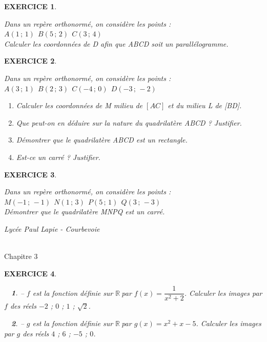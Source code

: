\documentclass[a4paper]{article}   %
\renewcommand{\(}{\left(}
\renewcommand{\)}{\right)}
\newtheorem{ques}{~}
\newenvironment{qu}{\begin{ques}--} {\end{ques}}
\newtheorem{EXO}{\large EXERCICE }
\newenvironment{EX}   { \setcounter{ques}{0} \begin{EXO} \hrulefill ~\vspace{0.3cm}

\normalfont}    {\end{EXO} \medskip}
\newcommand{\R}{ ${\mathbb R} ~$}
\newcommand{\f}{\dfrac} 	%
\def\cl{{\Large \bf{2nde}}}
\begin{document}
\begin{EX} Dans un repère orthonormé, on considère les points : $A(1\,;\,1) ~~ B(5\,;\,2)~~C(3\,;\,4)$ \\
Calculer les coordonnées de D afin que ABCD soit un parallélogramme.

\end{EX}

\begin{EX}  Dans un repère orthonormé, on considère les points : $A(3\,;\,1) ~~ B(2\,;\,3)~~C(-4\,;\,0)~~D(-3\,;\,-2)$
 \begin{enumerate}
\item Calculer les coordonnées de M milieu de $[AC]$ et du milieu L de [BD].
\item Que peut-on en déduire sur la nature du quadrilatère ABCD ? Justifier.
\item Démontrer que le quadrilatère ABCD est un rectangle.
\item Est-ce un carré ? Justifier.
\end{enumerate}
\end{EX}


\begin{EX}  Dans un repère orthonormé, on considère les points : $M(-1\,;\,-1) ~~ N(1\,;\,3)~~P(5\,;\,1)~~Q(3\,;\,-3)$ \\
Démontrer que le quadrilatère MNPQ est un carré.
\end{EX}




\newpage \setcounter{EXO}{0}


\noindent\begin{minipage}{.20\linewidth}\begin{center}                  
\noindent \emph{Lycée Paul Lapie - Courbevoie}
\end{center}\end{minipage}
\begin{minipage}{1.5\linewidth}\begin{center}	
\noindent \cl\\ Chapitre 3
\end{center}\end{minipage}

\begin{center} 	
\end{center}


\begin{EX}
\begin{qu} $f$ est la fonction définie sur \R par $f(x)=\f{1}{x^2+2}$. Calculer les images par $f$ des réels $-2$ ; $0$ ; $1$ ; $\sqrt{2}$.
\end{qu}
\begin{qu} $g$ est la fonction définie sur \R par $g(x)=x^2+x-5$. Calculer les images par $g$ des réels $4$ ; $6$ ; $-5$ ; $0$.
\end{qu}
\end{EX}
\end{document}
